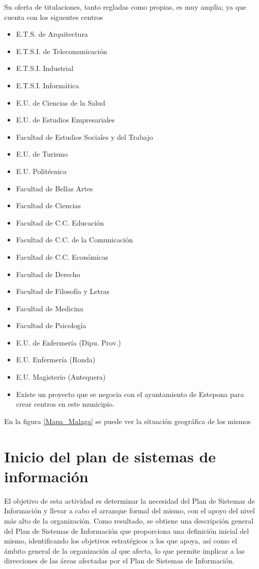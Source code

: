 \documentclass[11pt,a4paper,spanish,twoside]{book}
\begin{document}
Su oferta de titulaciones, tanto regladas como propias, es muy amplia; ya que 
cuenta con los siguentes centros
\begin{itemize}
  \item E.T.S. de Arquitectura
  \item E.T.S.I. de Telecomunicación
  \item E.T.S.I. Industrial
  \item E.T.S.I. Informática
  \item E.U. de Ciencias de la Salud
  \item E.U. de Estudios Empresariales
  \item Facultad de Estudios Sociales y del Trabajo
  \item E.U. de Turismo
  \item E.U. Politécnica
  \item Facultad de Bellas Artes
  \item Facultad de Ciencias
  \item Facultad de C.C. Educación
  \item Facultad de C.C. de la Comunicación
  \item Facultad de C.C. Económicas
  \item Facultad de Derecho
  \item Facultad de Filosofía y Letras
  \item Facultad de Medicina
  \item Facultad de Psicología
  \item E.U. de Enfermería (Dipu. Prov.)
  \item E.U. Enfermería (Ronda)
  \item E.U. Magisterio (Antequera)
  \item Existe un proyecto que se negocia con el ayuntamiento de Estepona para 
      crear centros en este municipio.
\end{itemize}

En la figura \ref{Mapa_Malaga} se puede ver la situación geográfica de los 
mismos


\chapter{Inicio del plan de sistemas de información}
El objetivo de esta actividad es determinar la necesidad del Plan de Sistemas  
de Información y llevar a cabo el arranque formal del mismo, con el apoyo del
nivel más alto de la organización. Como resultado, se obtiene una descripción
general del Plan de Sistemas de Información que proporciona una definición
inicial del mismo, identificando los objetivos estratégicos a los que apoya,
así como el ámbito general de la organización al que afecta, lo que permite
implicar a las direcciones de las áreas afectadas por el Plan de Sistemas de
Información. 
\end{document}
